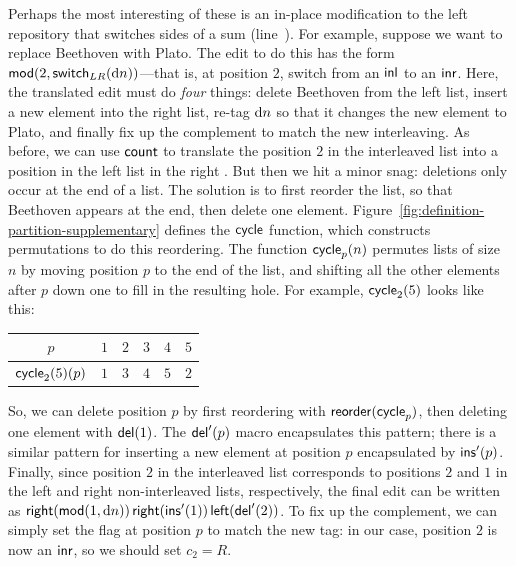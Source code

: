Perhaps the
most interesting of these is an in-place modification to the left repository
that switches sides of a sum (line~).
%
For example, suppose we want to replace Beethoven with Plato. The edit to do
this has the form $\mathsf{mod}(2,\mathsf{switch}_{LR}(\textrm{d} n))$---that is, at position
$2$, switch from an $\mathsf{inl}$ to an $\mathsf{inr}$.  Here, the translated edit
must do \emph{four} things: delete Beethoven from the left list, insert a
new element into the right list, re-tag $\textrm{d} n$ so that it changes the new
element to Plato, and finally fix up the complement to match the new
interleaving. As before, we can use $\mathsf{count}$ to translate the position $2$
in the interleaved list into a position in the left list in the right
\replica. But then we hit a minor snag: deletions only occur at the end of a
list. The solution is to first reorder the list, so that Beethoven appears
at the end, then delete one element.
Figure~\ref{fig:definition-partition-supplementary} defines the $\mathsf{cycle}$
function, which constructs permutations to do this reordering. The
function $\mathsf{cycle}_p(n)$ permutes lists of size $n$ by moving position $p$
to the end of the list, and shifting all the other elements after $p$ down
one to fill in the resulting hole. For example, $\mathsf{cycle}_2(5)$ looks like
this:
\begin{center}
    \begin{tabular}{c|ccccc}
        $p$ & $1$ & $2$ & $3$ & $4$ & $5$ \\
        \hline
        $\mathsf{cycle}_2(5)(p)$ & $1$ & $3$ & $4$ & $5$ & $2$
    \end{tabular}
\end{center}
So, we can delete position $p$ by first reordering with
$\mathsf{reorder}(\mathsf{cycle}_p)$, then deleting one element with $\mathsf{del}(1)$. The
$\mathsf{del}'(p)$ macro encapsulates this pattern; there is a similar pattern for
inserting a new element at position $p$ encapsulated by $\mathsf{ins}'(p)$.
Finally, since position $2$ in the interleaved list corresponds to positions
$2$ and $1$ in the left and right non-interleaved lists, respectively, the
final edit can be written as
$\mathsf{right}(\mathsf{mod}(1,\textrm{d} n))\,\mathsf{right}(\mathsf{ins}'(1))\,\mathsf{left}(\mathsf{del}'(2))$.
To fix up the complement, we can simply set the flag at position $p$ to
match the new tag: in our case, position $2$ is now an $\mathsf{inr}$, so we
should set $c_2=R$.


